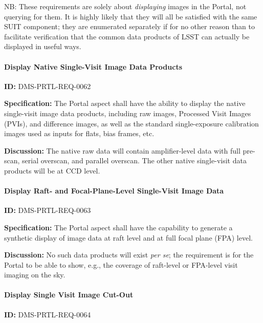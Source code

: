 \documentclass[SE,toc]{lsstdoc}
\begin{document}
NB: These requirements are solely about \textit{displaying} images in the Portal, not querying for them. It is highly likely that they will all be satisfied with the same SUIT component; they are enumerated separately if for no other reason than to facilitate verification that the common data products of LSST can actually be displayed in useful ways.

\paragraph{Display Native Single-Visit Image Data Products}\hfill  %

\label{DMS-PRTL-REQ-0062}
\textbf{ID:} DMS-PRTL-REQ-0062

\textbf{Specification:}
The Portal aspect shall have the ability to display the native single-visit image data products, including raw images, Processed Visit Images (PVIs), and difference images, as well as the standard single-exposure calibration images used as inputs for flats, bias frames, etc.

\textbf{Discussion:}
The native raw data will contain amplifier-level data with full pre-scan, serial overscan, and parallel overscan.
The other native single-visit data products will be at CCD level.

\paragraph{Display Raft- and Focal-Plane-Level Single-Visit  Image Data}\hfill  %

\label{DMS-PRTL-REQ-0063}
\textbf{ID:} DMS-PRTL-REQ-0063

\textbf{Specification:}
The Portal aspect shall have the capability to generate a synthetic display of image data at raft level and at full focal plane (FPA) level.

\textbf{Discussion:}
No such data products will exist \textit{per se}; the requirement is for the Portal to be able to show, e.g., the coverage of raft-level or FPA-level visit imaging on the sky.

\paragraph{Display Single Visit Image Cut-Out}\hfill  %

\label{DMS-PRTL-REQ-0064}
\textbf{ID:} DMS-PRTL-REQ-0064
\end{document}
